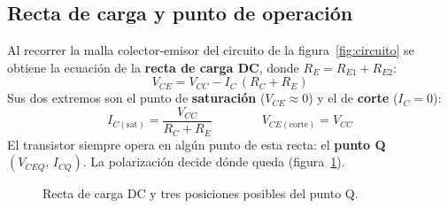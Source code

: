 \documentclass[11pt,a4paper]{article}
\begin{document}
\subsection{Recta de carga y punto de operación}
Al recorrer la malla colector-emisor del circuito de la figura~\ref{fig:circuito} se obtiene
la ecuación de la \textbf{recta de carga DC}, donde $R_E = R_{E1}+R_{E2}$:
\begin{equation}
  V_{CE} = V_{CC} - I_C\,(R_C + R_E)
  \label{eq:recta}
\end{equation}
Sus dos extremos son el punto de \textbf{saturación} ($V_{CE}\approx 0$) y el de
\textbf{corte} ($I_C = 0$):
\begin{equation}
  I_{C(\text{sat})} = \frac{V_{CC}}{R_C + R_E}
  \qquad\qquad
  V_{CE(\text{corte})} = V_{CC}
  \label{eq:extremos}
\end{equation}
El transistor siempre opera en algún punto de esta recta: el \textbf{punto Q}
$(V_{CEQ},\,I_{CQ})$. La polarización decide dónde queda
(figura~\ref{fig:recta-concepto}).

\begin{figure}[H]
  \centering
  \caption{Recta de carga DC y tres posiciones posibles del punto Q.}
  \label{fig:recta-concepto}
\end{figure}
\end{document}
